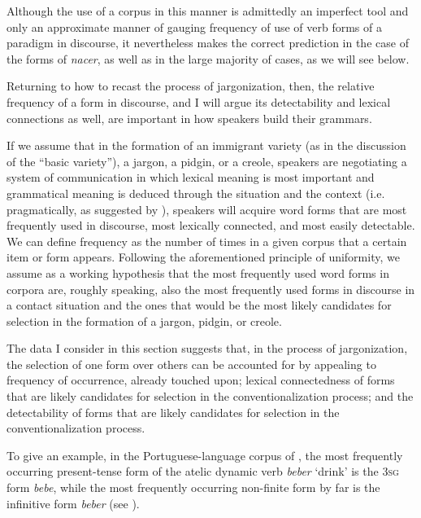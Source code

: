 \documentclass[output=paper,colorlinks,citecolor=brown]{langscibook}
\begin{document}
Although the use of a corpus in this manner is admittedly an imperfect tool and only an approximate manner of gauging frequency of use of verb forms of a paradigm in discourse, it nevertheless makes the correct prediction in the case of the forms of \textit{nacer}, as well as in the large majority of cases, as we will see below.

Returning to how to recast the process of jargonization, then, the relative frequency of a form in discourse, and I will argue its detectability and lexical connections as well, are important in how speakers build their grammars.

If we assume that in the formation of an immigrant variety (as in the discussion of the “basic variety”), a jargon, a pidgin, or a creole, speakers are negotiating a system of communication in which lexical meaning is most important and grammatical meaning is deduced through the situation and the context (i.e. pragmatically, as suggested by \citealt{Mühlhäusler1997}), speakers will acquire word forms that are most frequently used in discourse, most lexically connected, and most easily detectable. We can define frequency as the number of times in a given corpus that a certain item or form appears. Following the aforementioned principle of uniformity, we assume as a working hypothesis that the most frequently used word forms in corpora are, roughly speaking, also the most frequently used forms in discourse in a contact situation and the ones that would be the most likely candidates for selection in the formation of a jargon, pidgin, or creole. 

The data I consider in this section suggests that, in the process of jargonization, the selection of one form over others can be accounted for by appealing to frequency of occurrence, already touched upon; lexical connectedness of forms that are likely candidates for selection in the conventionalization process; and the detectability of forms that are likely candidates for selection in the conventionalization process. 

To give an example, in the Portuguese-language corpus of  \citet{DaviesFerreira2006}, the most frequently occurring present-tense form of the atelic dynamic verb \textit{beber} `drink' is the 3\textsc{sg} form \textit{bebe}, while the most frequently occurring non-finite form by far is the infinitive form \textit{beber} (see ).
\end{document}

